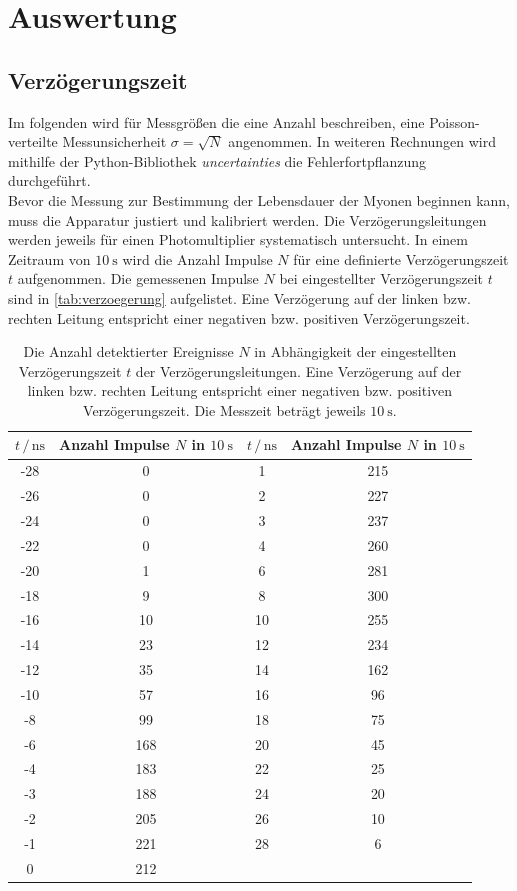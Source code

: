 \section{Auswertung}
\label{sec:Auswertung}

\subsection{Verzögerungszeit}
Im folgenden wird für Messgrößen die eine Anzahl beschreiben, eine Poisson-verteilte Messunsicherheit $\sigma = \sqrt{N}$ angenommen.
In weiteren Rechnungen wird mithilfe der Python-Bibliothek \textit{uncertainties}\cite{uncertainties} die Fehlerfortpflanzung durchgeführt.
\\
Bevor die Messung zur Bestimmung der Lebensdauer der Myonen beginnen kann, muss die Apparatur justiert und kalibriert werden.
Die Verzögerungsleitungen werden jeweils für einen Photomultiplier systematisch untersucht.
In einem Zeitraum von $\qty{10}{\second}$ wird die Anzahl Impulse $N$ für eine definierte Verzögerungszeit $t$ aufgenommen.
Die gemessenen Impulse $N$ bei eingestellter Verzögerungszeit $t$ sind in \autoref{tab:verzoegerung} aufgelistet.
Eine Verzögerung auf der linken bzw. rechten Leitung entspricht einer negativen bzw. positiven Verzögerungszeit.
\begin{table}
    \centering
    \caption{Die Anzahl detektierter Ereignisse $N$ in Abhängigkeit der eingestellten Verzögerungszeit $t$ der Verzögerungsleitungen.
    Eine Verzögerung auf der linken bzw. rechten Leitung entspricht einer negativen bzw. positiven Verzögerungszeit.
    Die Messzeit beträgt jeweils $\qty{10}{\second}$.
    }
    \label{tab:verzoegerung}
    \begin{tabular}{cc|cc}
        \toprule
        $t \,/\, \unit{\nano\second}$ & Anzahl Impulse $N$ in $\qty{10}{\second}$ & $t \,/\, \unit{\nano\second}$ & Anzahl Impulse $N$ in $\qty{10}{\second}$ \\
        \midrule
        -28 & 0 & 1 & 215 \\
        -26 & 0 & 2 & 227 \\
        -24 & 0 & 3 & 237 \\
        -22 & 0 & 4 & 260 \\
        -20 & 1 & 6 & 281 \\
        -18 & 9 & 8 & 300 \\
        -16 & 10 & 10 & 255 \\
        -14 & 23 & 12 & 234 \\
        -12 & 35 & 14 & 162 \\
        -10 & 57 & 16 & 96 \\
        -8 & 99 & 18 & 75 \\
        -6 & 168 & 20 & 45 \\
        -4 & 183 & 22 & 25 \\
        -3 & 188 & 24 & 20 \\
        -2 & 205 & 26 & 10 \\
        -1 & 221 & 28 & 6 \\
        0 & 212 & & \\
        \bottomrule
    \end{tabular}
\end{table}
